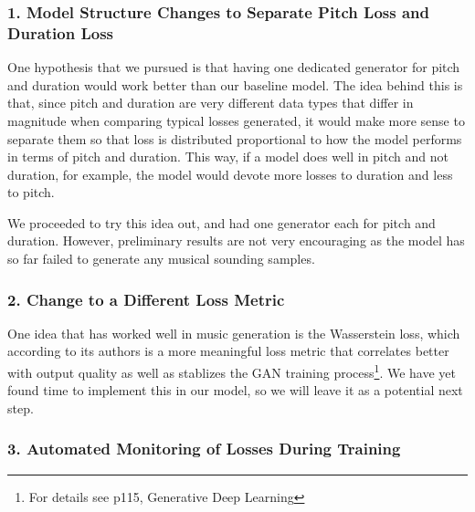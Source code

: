 \documentclass[12pt,oneside]{chicagocapstone}
\begin{document}
\hypertarget{model-structure-changes-to-separate-pitch-loss-and-duration-loss}{%
\subsubsection*{1. Model Structure Changes to Separate Pitch Loss and Duration Loss}\label{model-structure-changes-to-separate-pitch-loss-and-duration-loss}}

One hypothesis that we pursued is that having one dedicated generator for pitch and duration would work better than our baseline model. The idea behind this is that, since pitch and duration are very different data types that differ in magnitude when comparing typical losses generated, it would make more sense to separate them so that loss is distributed proportional to how the model performs in terms of pitch and duration. This way, if a model does well in pitch and not duration, for example, the model would devote more losses to duration and less to pitch.

We proceeded to try this idea out, and had one generator each for pitch and duration. However, preliminary results are not very encouraging as the model has so far failed to generate any musical sounding samples.

\hypertarget{change-to-a-different-loss-metric}{%
\subsubsection*{2. Change to a Different Loss Metric}\label{change-to-a-different-loss-metric}}

One idea that has worked well in music generation is the Wasserstein loss, which according to its authors is a more meaningful loss metric that correlates better with output quality as well as stablizes the GAN training process\footnote{For details see p115, Generative Deep Learning}. We have yet found time to implement this in our model, so we will leave it as a potential next step.

\hypertarget{automated-monitoring-of-losses-during-training}{%
\subsubsection*{3. Automated Monitoring of Losses During Training}\label{automated-monitoring-of-losses-during-training}}
\end{document}
